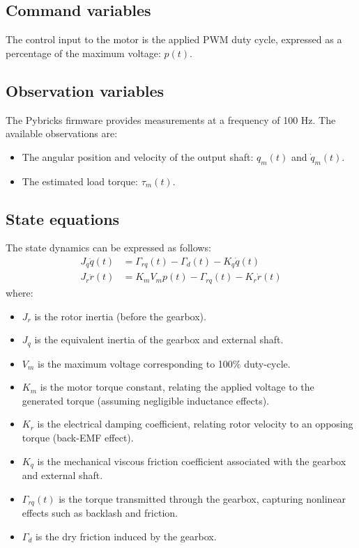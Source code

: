 \documentclass[english,12pt,a4paper]{article}
\begin{document}
	\subsection{Command variables}
	
		The control input to the motor is the applied PWM duty cycle, expressed as a percentage of the maximum voltage: $p(t)$.
		
	\subsection{Observation variables}
		The Pybricks firmware provides measurements at a frequency of 100 Hz. The available observations are:
		
		\begin{itemize}
			\item The angular position and velocity of the output shaft: $q_m(t)$ and $\dot{q}_m(t)$.
			\item The estimated load torque: $\tau_m(t)$.
		\end{itemize}
		
	
	\subsection{State equations}
	
		The state dynamics can be expressed as follows:
		\begin{align}
			J_q \ddot{q}(t) &= \Gamma_{rq}(t) - \Gamma_d(t) - K_q \dot{q}(t) \\
			J_r \ddot{r}(t) &= K_m V_m p(t) - \Gamma_{rq}(t) - K_r \dot{r}(t)
		\end{align}
		where:
		\begin{itemize}
			\item $J_r$ is the rotor inertia (before the gearbox).
			\item $J_q$ is the equivalent inertia of the gearbox and external shaft.
			\item $V_m$ is the maximum voltage corresponding to 100\% duty-cycle.
			\item $K_m$ is the motor torque constant, relating the applied voltage to the generated torque (assuming negligible inductance effects).
			\item $K_r$ is the electrical damping coefficient, relating rotor velocity to an opposing torque (back-EMF effect).
			\item $K_q$ is the mechanical viscous friction coefficient associated with the gearbox and external shaft.
			\item $\Gamma_{rq}(t)$ is the torque transmitted through the gearbox, capturing nonlinear effects such as backlash and friction.
			\item $\Gamma_d$ is the dry friction induced by the gearbox.
		\end{itemize}
		
\end{document}
